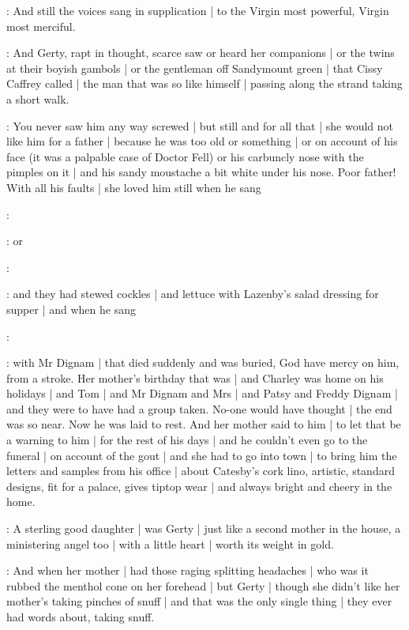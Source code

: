 \Nrelig:
And still the voices sang in supplication |
to the Virgin most powerful,
Virgin most merciful.

\gertyNovel:
And Gerty,
rapt in thought,
scarce saw or heard her companions |
or the twins at their boyish gambols |
or the gentleman off Sandymount green |
that Cissy Caffrey called |
the man that was so like himself |
passing along the strand taking a short walk.

\gertyReal:
You never saw him any way screwed |
but still and for all that |
she would not like him for a father |
because he was too old or something |
or on account of his face
(it was a palpable case of Doctor Fell)%
or his carbuncly nose with the pimples on it |
and his sandy moustache a bit white under his nose.
Poor father!
With all his faults |
she loved him still when he sang

\Father:
\stage{[singing]}

\gertyReal:
or

\Father:
\stage{[singing]}

\gertyReal:
and they had stewed cockles |
and lettuce with Lazenby's salad dressing for supper |
and when he sang

\Father:
\stage{[singing]}

\gertyReal:
with Mr Dignam |
that died suddenly and was buried,
God have mercy on him,
from a stroke.
Her mother's birthday that was |
and Charley was home on his holidays |
and Tom |
and Mr Dignam and Mrs |
and Patsy and Freddy Dignam |
and they were to have had a group taken.
No-one would have thought |
the end was so near.
Now he was laid to rest.
And her mother said to him |%
to let that be a warning to him |
for the rest of his days |
and he couldn't even go to the funeral |
on account of the gout |
and she had to go into town |
to bring him the letters and samples
from his office |
about Catesby's cork lino,
artistic,
standard designs,
fit for a palace,
gives tiptop wear |
and always bright and cheery in the home.

\gertyNovel:
A sterling good daughter |
was Gerty |
just like a second mother in the house,
a ministering angel too |
with a little heart |
worth its weight in gold.

\gertyReal:
And when her mother |
had those raging splitting headaches |
who was it rubbed the menthol cone on her forehead |
but Gerty |
though she didn't like her mother's taking pinches of snuff |
and that was the only single thing |
they ever had words about,
taking snuff.%

